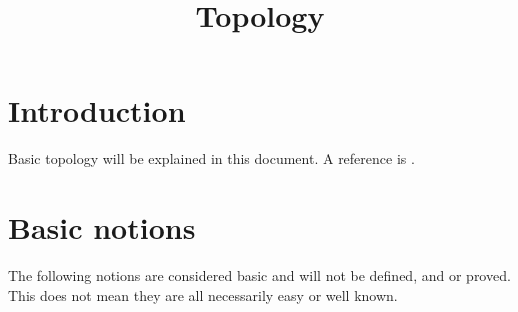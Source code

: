 

%


\title{Topology}


\maketitle

\label{section-phantom}

\tableofcontents

\section{Introduction}
\label{section-introduction}

\noindent
Basic topology will be explained in this document.
A reference is \cite{Engelking}.

\section{Basic notions}
\label{section-topology-basic}

\noindent
The following notions are considered basic and will not be defined,
and or proved. This does not mean they are all necessarily easy or
well known.

